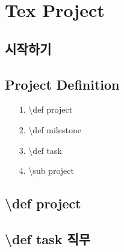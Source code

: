 





	\chapter{Tex Project}
	\minitoc



	\clearpage
	\section{시작하기}


	\clearpage
	\section{Project Definition}
	
	
			\begin{itemize}[topsep=0.0em, parsep=0.0em, itemsep=0em, leftmargin=4.0em, labelwidth=3em, labelsep=3em] 
			\item 	[1.] 	\textbackslash def project
			\item 	[2.] 	\textbackslash def milestone
			\item 	[3.]		\textbackslash def task
			\item 	[4.]		\textbackslash sub project
			\end{itemize}
	
	

	\clearpage
	\section{\textbackslash def project}

 

	\clearpage
	\section{\textbackslash def task 직무}




